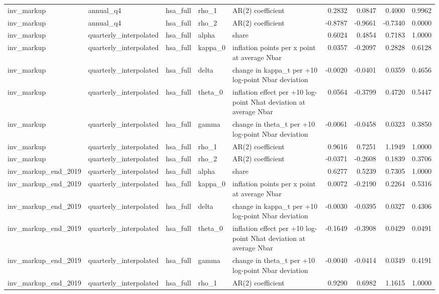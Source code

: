 \begin{tabular}{lllllrrrr}
inv\_markup & annual\_q4 & hsa\_full & rho\_1 & AR(2) coefficient & 0.2832 & 0.0847 & 0.4000 & 0.9962 \\
inv\_markup & annual\_q4 & hsa\_full & rho\_2 & AR(2) coefficient & -0.8787 & -0.9661 & -0.7340 & 0.0000 \\
inv\_markup & quarterly\_interpolated & hsa\_full & alpha & share & 0.6024 & 0.4854 & 0.7183 & 1.0000 \\
inv\_markup & quarterly\_interpolated & hsa\_full & kappa\_0 & inflation points per x point at average Nbar & 0.0357 & -0.2097 & 0.2828 & 0.6128 \\
inv\_markup & quarterly\_interpolated & hsa\_full & delta & change in kappa\_t per +10 log-point Nbar deviation & -0.0020 & -0.0401 & 0.0359 & 0.4656 \\
inv\_markup & quarterly\_interpolated & hsa\_full & theta\_0 & inflation effect per +10 log-point Nhat deviation at average Nbar & 0.0564 & -0.3799 & 0.4720 & 0.5447 \\
inv\_markup & quarterly\_interpolated & hsa\_full & gamma & change in theta\_t per +10 log-point Nbar deviation & -0.0061 & -0.0458 & 0.0323 & 0.3850 \\
inv\_markup & quarterly\_interpolated & hsa\_full & rho\_1 & AR(2) coefficient & 0.9616 & 0.7251 & 1.1949 & 1.0000 \\
inv\_markup & quarterly\_interpolated & hsa\_full & rho\_2 & AR(2) coefficient & -0.0371 & -0.2608 & 0.1839 & 0.3706 \\
inv\_markup\_end\_2019 & quarterly\_interpolated & hsa\_full & alpha & share & 0.6277 & 0.5239 & 0.7305 & 1.0000 \\
inv\_markup\_end\_2019 & quarterly\_interpolated & hsa\_full & kappa\_0 & inflation points per x point at average Nbar & 0.0072 & -0.2190 & 0.2264 & 0.5316 \\
inv\_markup\_end\_2019 & quarterly\_interpolated & hsa\_full & delta & change in kappa\_t per +10 log-point Nbar deviation & -0.0030 & -0.0395 & 0.0327 & 0.4306 \\
inv\_markup\_end\_2019 & quarterly\_interpolated & hsa\_full & theta\_0 & inflation effect per +10 log-point Nhat deviation at average Nbar & -0.1649 & -0.3908 & 0.0429 & 0.0491 \\
inv\_markup\_end\_2019 & quarterly\_interpolated & hsa\_full & gamma & change in theta\_t per +10 log-point Nbar deviation & -0.0040 & -0.0414 & 0.0349 & 0.4191 \\
inv\_markup\_end\_2019 & quarterly\_interpolated & hsa\_full & rho\_1 & AR(2) coefficient & 0.9290 & 0.6982 & 1.1615 & 1.0000 \\

\end{tabular}
